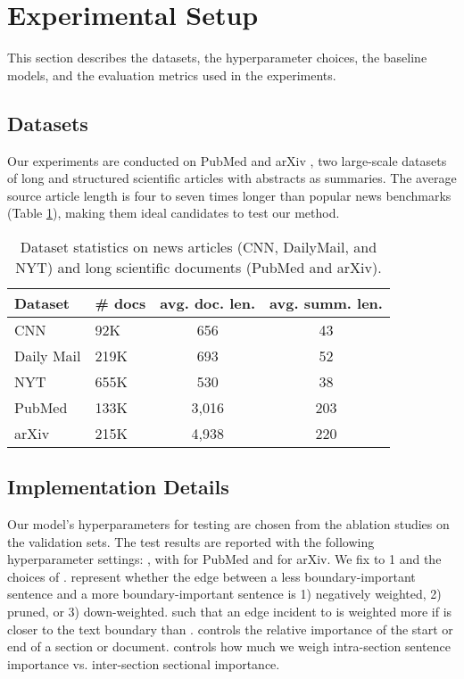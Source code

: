 \documentclass[11pt,a4paper]{article}
\begin{document}
\section{Experimental Setup}
This section describes the datasets, the hyperparameter choices, the baseline models, and the evaluation metrics used in the experiments. 

\subsection{Datasets}
Our experiments are conducted on PubMed and arXiv \cite{cohan2018discourse}, two large-scale datasets of long and structured scientific articles with abstracts as summaries. The average source article length is four to seven times longer than popular news benchmarks (Table \ref{tab:datasets}), making them ideal candidates to test our method. 
\begin{table}[t!]
\small
\centering
\begin{tabular}{|l|l|c|c|}
\toprule
Dataset & \# docs & avg. doc. len. & avg. summ. len. \\ \midrule
CNN & 92K & 656 & 43 \\ 
Daily Mail & 219K & 693 & 52 \\ 
NYT & 655K & 530 & 38 \\ 
PubMed & 133K & 3,016 & 203 \\ 
arXiv & 215K & 4,938 & 220 \\ 
\bottomrule
\end{tabular}
\caption{\small Dataset statistics on news articles (CNN, DailyMail, and NYT) and long scientific documents (PubMed and arXiv).} \label{tab:datasets}
\end{table}

\subsection{Implementation Details}\label{sub-sec:hyperparams}
Our model's hyperparameters for testing are chosen from the ablation studies on the validation sets. The test results are reported with the following hyperparameter settings: , with  for PubMed and  for arXiv.
We fix  to 1 and the choices of . represent whether the edge between a less boundary-important sentence and a more boundary-important sentence is 1) negatively weighted, 2) pruned, or 3) down-weighted.  such that an edge  incident to  is weighted more if  is closer to the text boundary than .  controls the relative importance of the start or end of a section or document.  controls how much we weigh intra-section sentence importance vs. inter-section sectional importance.
\end{document}
